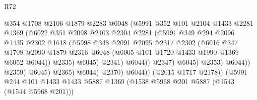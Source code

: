 \begin{lexlean}{R72}
\begin{coremodule}
                                    @354
                                    @1708
                                    @2106
                                    @1879
                                    @2283
                                    @6048
                                    (@5991
                                      @352
                                      @101
                                      @2104
                                      @1433
                                      @2281
                                      @1369
                                      (@6022
                                        @351
                                        @2098
                                        @2103
                                        @2304
                                        @2281
                                        (@5991
                                          @349
                                          @294
                                          @2096
                                          @1435
                                          @2302
                                          @1618
                                          (@5998
                                            @348
                                            @2091
                                            @2095
                                            @2317
                                            @2302
                                            (@6016
                                              @347
                                              @1708
                                              @2090
                                              @1879
                                              @2316
                                              @6048
                                              (@6005 @101 @1720 @1433 @1990 @1369 @6052 @6044))
                                            @2335)
                                          @6045)
                                        @2341)
                                      @6044))
                                  @2347)
                                @6045)
                              @2353)
                            @6044))
                        @2359)
                      @6045)
                    @2365)
                  @6044)
                @2370)
              @6044))
          (@2015 @1717 @2178))
        (@5991
          @244
          @101
          @1433
          @1433
          @5887
          @1369
          (@1538 @5968 @201 @5887 (@1543 (@1544 @5968 @201)))

\end{coremodule}
\end{lexlean}
